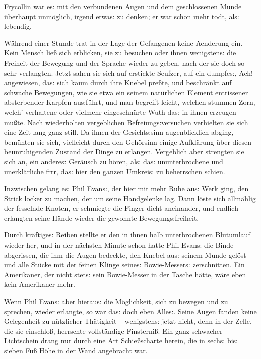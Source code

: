 \documentclass[oneside,12pt]{book}
\newcommand{\s}{s:}
\begin{document}
Frycollin war e{\s} mit den verbundenen Augen und dem geschlossenen
Munde \"uberhaupt unm\"oglich, irgend etwa{\s} zu denken; er war
schon mehr todt, al{\s} lebendig.

W\"ahrend einer Stunde trat in der Lage der Gefangenen keine
Aenderung ein. Kein Mensch lie{\ss} sich erblicken, sie zu besuchen
oder ihnen wenigsten{\s} die Freiheit der Bewegung und der Sprache
wieder zu geben, nach der sie doch so sehr verlangten. Jetzt sahen
sie sich auf erstickte Seufzer, auf ein dumpfe{\s},
{\glqq}Ach!{\grqq} angewiesen, da{\s} sich kaum durch ihre Knebel
pre{\ss}te, und beschr\"ankt auf schwache Bewegungen, wie sie etwa
ein seinem nat\"urlichen Element entrissener absterbender Karpfen
au{\s}f\"uhrt, und man begreift leicht, welchen stummen Zorn, welch'
verhaltene oder vielmehr eingeschn\"urte Wuth da{\s} in ihnen
erzeugen mu{\ss}te. Nach wiederholten vergeblichen
Befreiung{\s}versuchen verhielten sie sich eine Zeit lang ganz still.
Da ihnen der Gesicht{\s}sinn augenblicklich abging, bem\"uhten sie
sich, vielleicht durch den Geh\"orsinn einige Aufkl\"arung \"uber
diesen beunruhigenden Zustand der Dinge zu erlangen. Vergeblich aber
strengten sie sich an, ein andere{\s} Ger\"ausch zu h\"oren, al{\s}
da{\s} ununterbrochene und unerkl\"arliche {\glqq}frrr{\grqq}, da{\s}
hier den ganzen Umkrei{\s} zu beherrschen schien.

Inzwischen gelang e{\s} Phil Evan{\s}, der hier mit mehr Ruhe au{\s}
Werk ging, den Strick locker zu machen, der um seine Handgelenke lag.
Dann l\"oste sich allm\"ahlig der fesselnde Knoten, er schmiegte die
Finger dicht aneinander, und endlich erlangten seine H\"ande wieder
die gewohnte Bewegung{\s}freiheit.

Durch kr\"aftige{\s} Reiben stellte er den in ihnen halb
unterbrochenen Blutumlauf wieder her, und in der n\"achsten Minute
schon hatte Phil Evan{\s} die Binde abgerissen, die ihm die Augen
bedeckte, den Knebel au{\s} seinem Munde gel\"ost und alle St\"ucke
mit der feinen Klinge seine{\s} {\glqq}Bowie-Messer{\s}{\grqq}
zerschnitten. Ein Amerikaner, der nicht stet{\s} sein Bowie-Messer in
der Tasche h\"atte, w\"are eben kein Amerikaner mehr.

Wenn Phil Evan{\s} aber hierau{\s} die M\"oglichkeit, sich zu bewegen
und zu sprechen, wieder erlangte, so war da{\s} doch eben Alle{\s}.
Seine Augen fanden keine Gelegenheit zu n\"utzlicher Th\"atigkeit --
wenigsten{\s} jetzt nicht, denn in der Zelle, die sie einschlo{\ss},
herrschte vollst\"andige Finsterni{\ss}. Ein ganz schwacher
Lichtschein drang nur durch eine Art Schie{\ss}scharte herein, die in
sech{\s} bi{\s} sieben Fu{\ss} H\"ohe in der Wand angebracht war.
\end{document}
